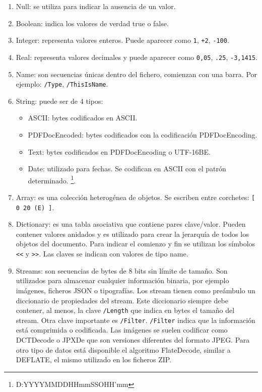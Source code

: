 \begin{enumerate}
    \item Null: se utiliza para indicar la ausencia de un valor.
    \item Boolean: indica los valores de verdad true o false.
    \item Integer: representa valores enteros. Puede aparecer como \verb|1|, \verb|+2|, \verb|-100|.
    \item Real: representa valores decimales y puede aparecer como \verb|0,05|, \verb|.25|, \verb|-3,1415|.
    \item Name: son secuencias únicas dentro del fichero, comienzan con una barra. Por ejemplo: \verb|/Type|, \verb|/ThisIsName|.
    \item String: puede ser de 4 tipos:
    \begin{itemize}
        \item ASCII: bytes codificados en ASCII.
        \item PDFDocEncoded: bytes codificados con la codificación PDFDocEncoding.
        \item Text: bytes codificados en PDFDocEncoding o UTF-16BE.
        \item Date: utilizado para fechas. Se codifican en ASCII con el patrón determinado. \footnote{D:YYYYMMDDHHmmSSOHH’mm}.
    \end{itemize}
    \item Array: es una colección heterogénea de objetos. Se escriben entre corchetes: \verb|[ 0 20 (E) ]|.
    \item Dictionary: es una tabla asociativa que contiene pares clave/valor. Pueden contener valores anidados y es utilizado para crear la jerarquía de todos los objetos del documento. Para indicar el comienzo y fin se utilizan los símbolos \verb|<<| y \verb|>>|. Las claves se indican con valores de tipo name.
    \item Streams: son secuencias de bytes de 8 bits sin límite de tamaño. Son utilizados para almacenar cualquier información binaria, por ejemplo imágenes, ficheros JSON o tipografías. Los stream tienen como preámbulo un diccionario de propiedades del stream. Este diccionario siempre debe contener, al menos, la clave \verb|/Length| que indica en bytes el tamaño del stream. Otra clave importante es \verb|/Filter|. \verb|/Filter| indica que la información está comprimida o codificada. Las imágenes se suelen codificar como DCTDecode o JPXDe que son versiones diferentes del formato JPEG. Para otro tipo de datos está disponible el algoritmo FlateDecode, similar a  DEFLATE, el mismo utilizado en los ficheros ZIP.
\end{enumerate}

